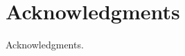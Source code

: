 \documentclass[twocolumn]{aastex62}
\begin{document}
\section{Acknowledgments}\label{sec:acknowledgments}

Acknowledgments.



\newpage


\end{document}
